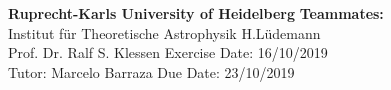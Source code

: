 \documentclass[a4paper, 11pt]{article}
\begin{document}
\large\textbf{Ruprecht-Karls University of Heidelberg} \hfill \textbf{Teammates:} \\
\normalsize Institut für Theoretische Astrophysik \hfill 
H.Lüdemann  \\
Prof. Dr. Ralf S. Klessen \hfill Exercise Date: 16/10/2019 \\
Tutor: Marcelo Barraza \hfill Due Date: 23/10/2019 \\




\end{document}
